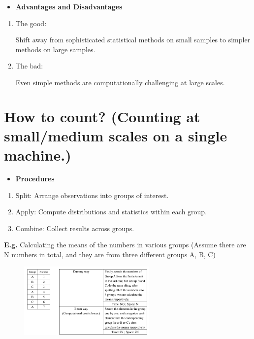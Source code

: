 \begin{itemize}
\item \textbf{Advantages and Disadvantages}
\end{itemize}
\begin{enumerate}
\item The good:

Shift away from sophisticated statistical methods on small samples to simpler methods on large samples.

\item The bad:

Even simple methods are computationally challenging at large scales.
\end{enumerate}

\section{ How to count? (Counting at small/medium scales on a single machine.) }


\begin{itemize}
\item \textbf{Procedures}
\end{itemize}

\begin{enumerate}
\item Split: Arrange observations into groups of interest.
\item Apply: Compute distributions and statistics within each group.
\item Combine: Collect results across groups.
\end{enumerate}

\textbf{E.g. }Calculating the means of the numbers in various groups (Assume there are N numbers in total, and they are from three different groups A, B, C)

\begin{figure}[ht]
  \begin{center}
    \includegraphics[width=0.6\textwidth]{figures/scribe_notes.png}
    \label{fig:scribe_notes}
  \end{center}
\end{figure}

